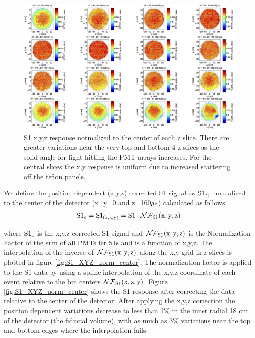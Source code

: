 \renewcommand{\baselinestretch}{1}
\small\normalsize
\begin{figure}\centering
\includegraphics[width=230mm]{Chapter_XYZ_Corr/Thesis_Corr_Plots/S1_XYZ_Kr_norm_center_slice_crop.png}
\caption{S1 x,y,z response normalized to the center of each z slice. There are greater variations near the very top and bottom 4 z slices as the solid angle for light hitting the PMT arrays increases. For the central slices the x,y response is uniform due to increased scattering off the teflon panels. }
\label{fig:S1_XYZ_norm_center_slice}
\end{figure}
\renewcommand{\baselinestretch}{2}
\small\normalsize

\newpage

We define the position dependent  (x,y,z) corrected S1 signal as $\rm S1{_c}$, normalized to the center of the detector (x=y=0 and z=160$\rm \mu s$) calculated as follows:
\begin{equation}
\rm S1_{c}= S1_{(x,z,y)}=S1 \cdot \mathcal{NF}_{S1}(x,y,z)
\label{eq:S1_XYZ}
\end{equation}

\noindent where $\rm S1_{c}$ is the x,y,z corrected S1 signal and $\rm \mathcal{NF}_{S1}(x,y,z)$ is the Normalization Factor of the sum of all PMTs for S1s and is a function of x,y,z. The interpolation of the inverse of $\rm \mathcal{NF}_{S1}(x,y,z)$ along the x,y grid in z slices is plotted in figure \ref{fig:S1_XYZ_norm_center}. The normalization factor is applied to the S1 data by using a spline interpolation of the x,y,z coordinate of each event relative to the bin centers $\rm \mathcal{NF}_{S1}(x,z,y)$. Figure \ref{fig:S1_XYZ_norm_center} shows the S1 response after correcting the data relative to the center of the detector. After applying the x,y,z correction the position dependent variations decrease to less than 1\% in the inner radial 18 cm of the detector (the fiducial volume), with as much as 3\% variations near the top and bottom edges where the interpolation fails.

